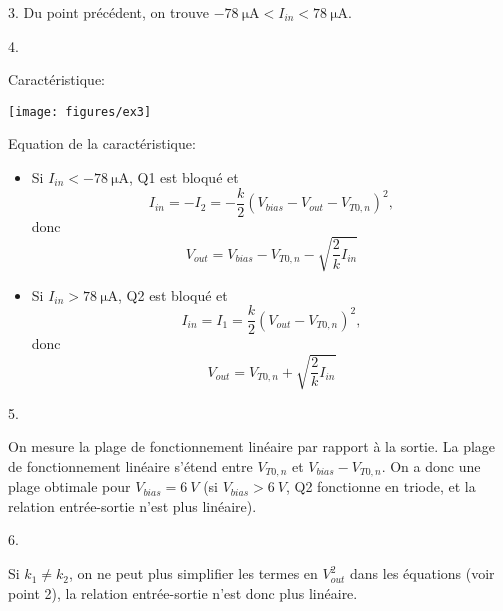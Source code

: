 3.
Du point précédent, on trouve $-\SI{78}{\micro\ampere} < I_{in} < \SI{78}{\micro\ampere}$.

4.

Caractéristique:
\begin{center}
\texttt{[image: figures/ex3]}
\end{center}

Equation de la caractéristique:
\begin{itemize}
    \item Si $I_{in} < \SI{-78}{\micro\ampere}$, Q1 est bloqué et
        \[I_{in} = - I_2 = -\frac{k}{2}\left(V_{bias} - V_{out} - V_{T0,n}\right)^2,\]
        donc \[V_{out} = V_{bias} - V_{T0,n} - \sqrt{\frac{2}{k}I_{in}}\]
    \item Si $I_{in} > \SI{78}{\micro\ampere}$, Q2 est bloqué et
        \[I_{in} = I_1 = \frac{k}{2}\left(V_{out} - V_{T0,n}\right)^2,\]
        donc \[V_{out} = V_{T0,n} + \sqrt{\frac{2}{k}I_{in}}\]
\end{itemize}


5.

On mesure la plage de fonctionnement linéaire par rapport à la sortie. La plage de fonctionnement linéaire s'étend entre $V_{T0,n}$ et $V_{bias} - V_{T0,n}$. On a donc une plage obtimale pour $V_{bias} = \SI{6}{V}$ (si $V_{bias} > \SI{6}{V}$, Q2 fonctionne en triode, et la relation entrée-sortie n'est plus linéaire).

6.

Si $k_1 \neq k_2$, on ne peut plus simplifier les termes en $V_{out}^2$ dans les équations (voir point 2), la relation entrée-sortie n'est donc plus linéaire.

